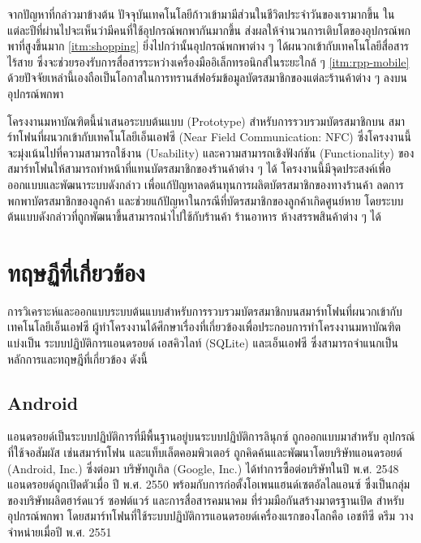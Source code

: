 \documentclass[a4paper]{article}
\begin{document}
จากปัญหาที่กล่าวมาข้างต้น ปัจจุบันเทคโนโลยีก้าวเข้ามามีส่วนในชีวิตประจำวันของเรามากขึ้น ในแต่ละปีที่ผ่านไปจะเห็นว่ามีคนที่ใช้อุปกรณ์พกพากันมากขึ้น ส่งผลให้จำนวนการเติบโตของอุปกรณ์พกพาที่สูงขึ้นมาก \ref{itm:shopping} ยิ่งไปกว่านั้นอุปกรณ์พกพาต่าง ๆ ได้ผนวกเข้ากับเทคโนโลยีสื่อสารไร้สาย ซึ่งจะช่วยรองรับการสื่อสารระหว่างเครื่องมืออิเล็กทรอนิกส์ในระยะใกล้ ๆ \ref{itm:rpp-mobile} ด้วยปัจจัยเหล่านี้เองถือเป็นโอกาสในการทรานส์ฟอร์มข้อมูลบัตรสมาชิกของแต่ละร้านค้าต่าง ๆ ลงบนอุปกรณ์พกพา 

โครงงานมหาบัณฑิตนี้นำเสนอระบบต้นแบบ (Prototype) สำหรับการรวบรวมบัตรสมาชิกบน \newline สมาร์ทโฟนที่ผนวกเข้ากับเทคโนโลยีเอ็นเอฟซี (Near Field Communication: NFC) ซึ่งโครงงานนี้จะมุ่งเน้นไปที่ความสามารถใช้งาน (Usability) และความสามารถเชิงฟังก์ชัน (Functionality) ของสมาร์ทโฟนให้สามารถทำหน้าที่แทนบัตรสมาชิกของร้านค้าต่าง ๆ ได้ โครงงานนี้มีจุดประสงค์เพื่อออกแบบและพัฒนาระบบดังกล่าว เพื่อแก้ปัญหาลดต้นทุนการผลิตบัตรสมาชิกของทางร้านค้า ลดการพกพาบัตรสมาชิกของลูกค้า และช่วยแก้ปัญหาในกรณีที่บัตรสมาชิกของลูกค้าเกิดศูนย์หาย โดยระบบต้นแบบดังกล่าวที่ถูกพัฒนาขึ้นสามารถนำไปใช้กับร้านค้า ร้านอาหาร ห้างสรรพสินค้าต่าง ๆ ได้


\section{ทฤษฏีที่เกี่ยวข้อง}
การวิเคราะห์และออกแบบระบบต้นแบบสำหรับการรวบรวมบัตรสมาชิกบนสมาร์ทโฟนที่ผนวกเข้ากับเทคโนโลยีเอ็นเอฟซี ผู้ทำโครงงานได้ศึกษาเรื่องที่เกี่ยวข้องเพื่อประกอบการทําโครงงานมหาบัณฑิต แบ่งเป็น ระบบปฏิบัติการแอนดรอยด์ เอสคิวไลท์ (SQLite) และเอ็นเอฟซี ซึ่งสามารถจําแนกเป็นหลักการและทฤษฎีที่เกี่ยวข้อง ดังนี้

\subsection{Android}
แอนดรอยด์เป็นระบบปฏิบัติการที่มีพื้นฐานอยู่บนระบบปฏิบัติการลินุกซ์ ถูกออกแบบมาสำหรับ \newline อุปกรณ์ที่ใช้จอสัมผัส เช่นสมาร์ทโฟน และแท็บเล็ตคอมพิวเตอร์ ถูกคิดค้นและพัฒนาโดยบริษัทแอนดรอยด์ (Android, Inc.) ซึ่งต่อมา บริษัทกูเกิล (Google, Inc.) ได้ทำการซื้อต่อบริษัทในปี พ.ศ. 2548 แอนดรอยด์ถูกเปิดตัวเมื่อ ปี พ.ศ. 2550 พร้อมกับการก่อตั้งโอเพนแฮนด์เซตอัลไลแอนซ์ ซึ่งเป็นกลุ่มของบริษัทผลิตฮาร์ดแวร์ ซอฟต์แวร์ และการสื่อสารคมนาคม ที่ร่วมมือกันสร้างมาตรฐานเปิด สำหรับอุปกรณ์พกพา โดยสมาร์ทโฟนที่ใช้ระบบปฏิบัติการแอนดรอยด์เครื่องแรกของโลกคือ เอชทีซี ดรีม วางจำหน่ายเมื่อปี พ.ศ. 2551
\end{document}
